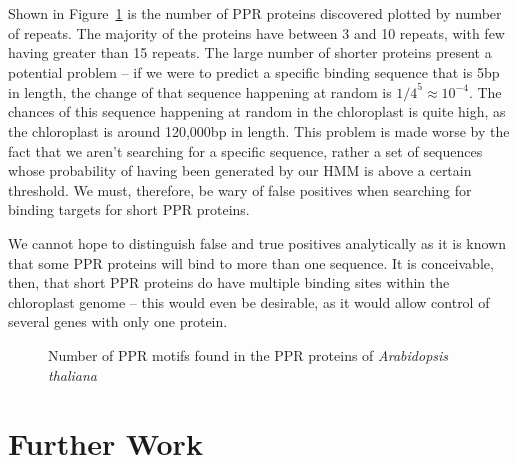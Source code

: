 \documentclass[twoside,a4paper]{article}
\begin{document}
\begin{multicols}{2}
Shown in Figure~\ref{fig:ppr} is the number of PPR proteins discovered plotted
by number of repeats.
The majority of the proteins have between 3 and 10 repeats, with few having
greater than 15 repeats.
The large number of shorter proteins present a potential problem -- if we were
to predict a specific binding sequence that is 5bp in length, the change of
that sequence happening at random is ${1/4}^5 \approx 10^{-4}$.
The chances of this sequence happening at random in the chloroplast is quite
high, as the chloroplast is around 120,000bp in length.
This problem is made worse by the fact that we aren't searching for a specific
sequence, rather a set of sequences whose probability of having been generated
by our HMM is above a certain threshold.
We must, therefore, be wary of false positives when searching for binding 
targets for short PPR proteins.

We cannot hope to distinguish false and true positives analytically as it is
known that some PPR proteins will bind to more than one
sequence\cite{Barkan2012}.
It is conceivable, then, that short PPR proteins do have multiple binding sites
within the chloroplast genome -- this would even be desirable, as it would
allow control of several genes with only one protein.

\begin{figure}[H]

  \caption{Number of PPR motifs found in the PPR proteins of
    \textit{Arabidopsis thaliana}}
  \label{fig:ppr}
\end{figure}

\section{Further Work}


\end{multicols}
\end{document}

